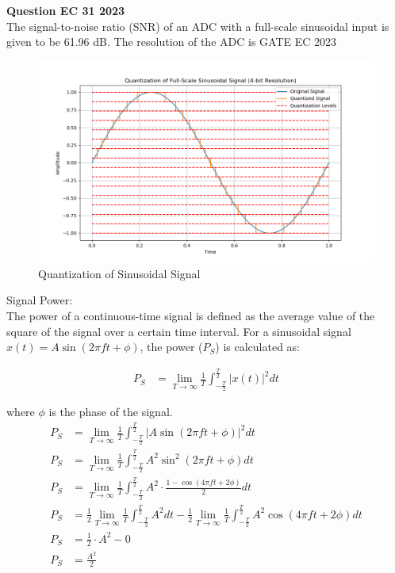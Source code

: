 \documentclass[journal,12pt,onecolumn]{IEEEtran}
\begin{document}
\vspace{3cm}
\title{}
\author{EE22BTECH11049 - Shivansh Kirar}
\maketitle
\textbf{Question EC 31 2023}\\
The signal-to-noise ratio (SNR) of an ADC with a full-scale sinusoidal input is given to be 61.96 dB. The resolution of the ADC is \hfill{GATE EC 2023}
\fi
\solution
\begin{table}[H]

\label{table:Gate.31.2023.0}
\end{table}
\begin{figure}[H]
  \centering
  \includegraphics[width=1\textwidth]{2023/EC/31/Graph/a.png}
  \caption{Quantization of Sinusoidal Signal}
  \label{fig:Gate.31.2023.1}
\end{figure}
\enumerate
\item Signal Power: \\
The power of a continuous-time signal is defined as the average value of the square of the signal over a certain time interval. For a sinusoidal signal \(x(t) = A \sin(2\pi f t + \phi)\), the power (\(P_S\)) is calculated as:

\begin{align}
P_S &= \lim_{{T \to \infty}} \frac{1}{T} \int_{{-\frac{T}{2}}}^{{\frac{T}{2}}} |x(t)|^2 dt
\end{align}

where \(\phi\) is the phase of the signal.
\begin{align}
P_S &= \lim_{{T \to \infty}} \frac{1}{T} \int_{{-\frac{T}{2}}}^{{\frac{T}{2}}} |A \sin(2\pi f t + \phi)|^2 dt\\
P_S &= \lim_{{T \to \infty}} \frac{1}{T} \int_{{-\frac{T}{2}}}^{{\frac{T}{2}}} A^2 \sin^2(2\pi f t + \phi) dt\\
P_S &= \lim_{{T \to \infty}} \frac{1}{T} \int_{{-\frac{T}{2}}}^{{\frac{T}{2}}} A^2 \cdot \frac{1 - \cos(4\pi f t + 2\phi)}{2} dt\\
P_S &= \frac{1}{2} \lim_{{T \to \infty}} \frac{1}{T} \int_{{-\frac{T}{2}}}^{{\frac{T}{2}}} A^2 dt - \frac{1}{2} \lim_{{T \to \infty}} \frac{1}{T} \int_{{-\frac{T}{2}}}^{{\frac{T}{2}}} A^2 \cos(4\pi f t + 2\phi) dt\\
P_S &= \frac{1}{2} \cdot A^2 - 0\\
P_S &= \frac{A^2}{2}\\
\end{align}
\end{document}
